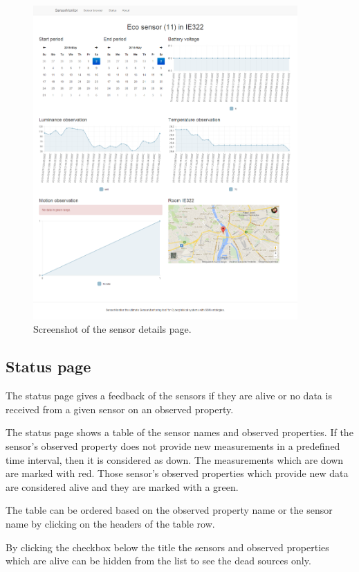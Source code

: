 \begin{figure}[h]
\centering
\includegraphics[width=0.9\textwidth]{figures/shshow.png}
\caption{Screenshot of the sensor details page.\label{fig:shshow}}
\end{figure}

\subsection{Status page}

The status page gives a feedback of the sensors if they are alive or no data is received from a given sensor on an observed property.

The status page shows a table of the sensor names and observed properties. If the sensor's observed property does not provide new measurements in a predefined time interval, then it is considered as down. The measurements which are down are marked with red. Those sensor's observed properties which provide new data are considered alive and they are marked with a green. 

The table can be ordered based on the observed property name or the sensor name by clicking on the headers of the table row. 

By clicking the checkbox below the title the sensors and observed properties which are alive can be hidden from the list to see the dead sources only.

